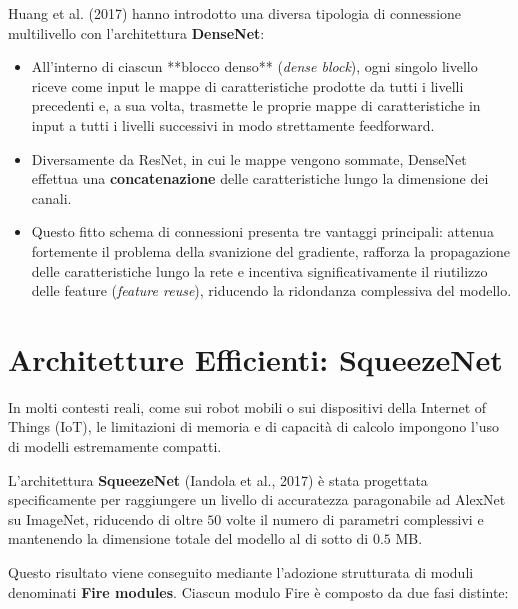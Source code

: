﻿\documentclass[11pt, a4paper]{article}
\begin{document}
Huang et al. (2017) hanno introdotto una diversa tipologia di connessione multilivello con l'architettura \textbf{DenseNet}:

\begin{itemize}
    \item All'interno di ciascun **blocco denso** (\emph{dense block}), ogni singolo livello riceve come input le mappe di caratteristiche prodotte da tutti i livelli precedenti e, a sua volta, trasmette le proprie mappe di caratteristiche in input a tutti i livelli successivi in modo strettamente feedforward.
    \item Diversamente da ResNet, in cui le mappe vengono sommate, DenseNet effettua una \textbf{concatenazione} delle caratteristiche lungo la dimensione dei canali.
    \item Questo fitto schema di connessioni presenta tre vantaggi principali: attenua fortemente il problema della svanizione del gradiente, rafforza la propagazione delle caratteristiche lungo la rete e incentiva significativamente il riutilizzo delle feature (\emph{feature reuse}), riducendo la ridondanza complessiva del modello.
\end{itemize}


\newpage

\section{Architetture Efficienti: SqueezeNet}

In molti contesti reali, come sui robot mobili o sui dispositivi della Internet of Things (IoT), le limitazioni di memoria e di capacità di calcolo impongono l'uso di modelli estremamente compatti.

L'architettura \textbf{SqueezeNet} (Iandola et al., 2017) è stata progettata specificamente per raggiungere un livello di accuratezza paragonabile ad AlexNet su ImageNet, riducendo di oltre $50$ volte il numero di parametri complessivi e mantenendo la dimensione totale del modello al di sotto di $0.5$ MB.

Questo risultato viene conseguito mediante l'adozione strutturata di moduli denominati \textbf{Fire modules}. Ciascun modulo Fire è composto da due fasi distinte:
\end{document}
